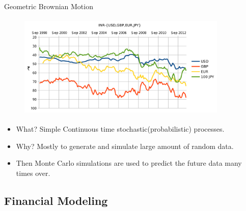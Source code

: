 \documentclass{beamer}
\begin{document}
\begin{frame}{Geometric Brownian Motion}
  \begin{figure}
  \includegraphics[width=10cm,height=5cm]{Brownian_Motion}\\
  \end{figure}
  \begin{itemize}
  
  \item {
    What? Simple Continuous time stochastic(probabilistic) processes.
  }
  \item {
    Why? Mostly to generate and simulate large amount of random data.
  }
  \item {
     Then Monte Carlo simulations are used to predict the future data many times over.
  }

  \end{itemize}
\end{frame}

\subsection{Financial Modeling}
\end{document}
